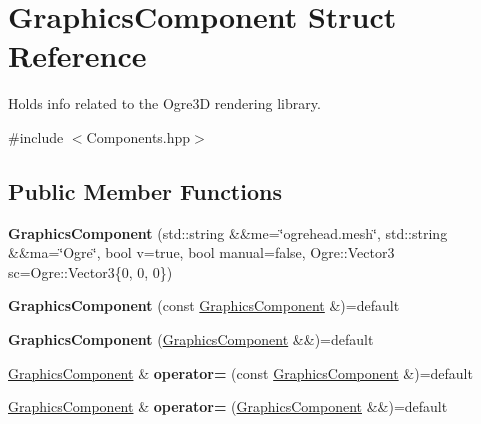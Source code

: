 \hypertarget{struct_graphics_component}{}\section{Graphics\+Component Struct Reference}
\label{struct_graphics_component}


Holds info related to the Ogre3D rendering library.  




{\ttfamily \#include $<$Components.\+hpp$>$}

\subsection*{Public Member Functions}
\begin{DoxyCompactItemize}
\item 
{\bfseries Graphics\+Component} (std\+::string \&\&me=\char`\"{}ogrehead.\+mesh\char`\"{}, std\+::string \&\&ma=\char`\"{}Ogre\char`\"{}, bool v=true, bool manual=false, Ogre\+::\+Vector3 sc=Ogre\+::\+Vector3\{0, 0, 0\})\hypertarget{struct_graphics_component_a5d6bd4ff86cca23191caeef3c9da4df1}{}\label{struct_graphics_component_a5d6bd4ff86cca23191caeef3c9da4df1}

\item 
{\bfseries Graphics\+Component} (const \hyperlink{struct_graphics_component}{Graphics\+Component} \&)=default\hypertarget{struct_graphics_component_a920145e7512de4591ca500e318ddd40b}{}\label{struct_graphics_component_a920145e7512de4591ca500e318ddd40b}

\item 
{\bfseries Graphics\+Component} (\hyperlink{struct_graphics_component}{Graphics\+Component} \&\&)=default\hypertarget{struct_graphics_component_a96a0b90002606a5345ca6bf0f6668484}{}\label{struct_graphics_component_a96a0b90002606a5345ca6bf0f6668484}

\item 
\hyperlink{struct_graphics_component}{Graphics\+Component} \& {\bfseries operator=} (const \hyperlink{struct_graphics_component}{Graphics\+Component} \&)=default\hypertarget{struct_graphics_component_ac21301a495f152db325689d6d78dac48}{}\label{struct_graphics_component_ac21301a495f152db325689d6d78dac48}

\item 
\hyperlink{struct_graphics_component}{Graphics\+Component} \& {\bfseries operator=} (\hyperlink{struct_graphics_component}{Graphics\+Component} \&\&)=default\hypertarget{struct_graphics_component_ab28d0c007a37ad7fdf08780bf5c45ba2}{}\label{struct_graphics_component_ab28d0c007a37ad7fdf08780bf5c45ba2}

\end{DoxyCompactItemize}
